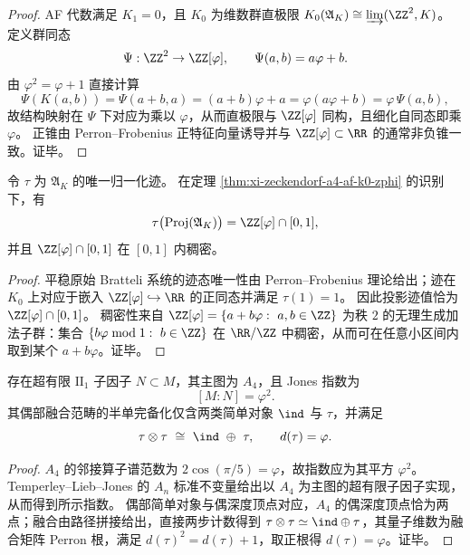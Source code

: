\begin{proof}
AF 代数满足 \(K_1=0\)，且 \(K_0\) 为维数群直极限
\(
K_0(\mathfrak{A}_K)\cong \varinjlim(\ZZ^2,K)
\)。
定义群同态
\[
\Psi:\ZZ^2\to \ZZ[\varphi],\qquad \Psi(a,b)=a\varphi+b.
\]
由 \(\varphi^2=\varphi+1\) 直接计算
\[
\Psi(K(a,b))=\Psi(a+b,a)=(a+b)\varphi+a=\varphi(a\varphi+b)=\varphi\,\Psi(a,b),
\]
故结构映射在 \(\Psi\) 下对应为乘以 \(\varphi\)，从而直极限与 \(\ZZ[\varphi]\) 同构，且细化自同态即乘 \(\varphi\)。
正锥由 Perron--Frobenius 正特征向量诱导并与 \(\ZZ[\varphi]\subset\RR\) 的通常非负锥一致。证毕。
\end{proof}

\begin{corollary}\label{cor:xi-zeckendorf-a4-af-trace-range-dense}
令 \(\tau\) 为 \(\mathfrak{A}_K\) 的唯一归一化迹。
在定理 \ref{thm:xi-zeckendorf-a4-af-k0-zphi} 的识别下，有
\[
\tau\bigl(\mathrm{Proj}(\mathfrak{A}_K)\bigr)=\ZZ[\varphi]\cap[0,1],
\]
并且 \(\ZZ[\varphi]\cap[0,1]\) 在 \([0,1]\) 内稠密。
\end{corollary}

\begin{proof}
平稳原始 Bratteli 系统的迹态唯一性由 Perron--Frobenius 理论给出；迹在 \(K_0\) 上对应于嵌入 \(\ZZ[\varphi]\hookrightarrow\RR\) 的正同态并满足 \(\tau(1)=1\)。
因此投影迹值恰为 \(\ZZ[\varphi]\cap[0,1]\)。
稠密性来自 \(\ZZ[\varphi]=\{a+b\varphi:\ a,b\in\ZZ\}\) 为秩 \(2\) 的无理生成加法子群：集合 \(\{b\varphi\bmod 1:\ b\in\ZZ\}\) 在 \(\RR/\ZZ\) 中稠密，从而可在任意小区间内取到某个 \(a+b\varphi\)。证毕。
\end{proof}

\begin{theorem}\label{thm:xi-zeckendorf-a4-subfactor-fib-fusion}
存在超有限 \(\mathrm{II}_1\) 子因子 \(N\subset M\)，其主图为 \(A_4\)，且 Jones 指数为
\[
[M:N]=\varphi^2.
\]
其偶部融合范畴的半单完备化仅含两类简单对象 \(\ind\) 与 \(\tau\)，并满足
\[
\tau\otimes\tau\ \cong\ \ind\ \oplus\ \tau,
\qquad
d(\tau)=\varphi.
\]
\end{theorem}

\begin{proof}
\(A_4\) 的邻接算子谱范数为 \(2\cos(\pi/5)=\varphi\)，故指数应为其平方 \(\varphi^2\)。
Temperley--Lieb--Jones 的 \(A_n\) 标准不变量给出以 \(A_4\) 为主图的超有限子因子实现，从而得到所示指数。
偶部简单对象与偶深度顶点对应，\(A_4\) 的偶深度顶点恰为两点；融合由路径拼接给出，直接两步计数得到 \(\tau\otimes\tau\simeq \ind\oplus\tau\)，其量子维数为融合矩阵 Perron 根，满足 \(d(\tau)^2=d(\tau)+1\)，取正根得 \(d(\tau)=\varphi\)。证毕。
\end{proof}
